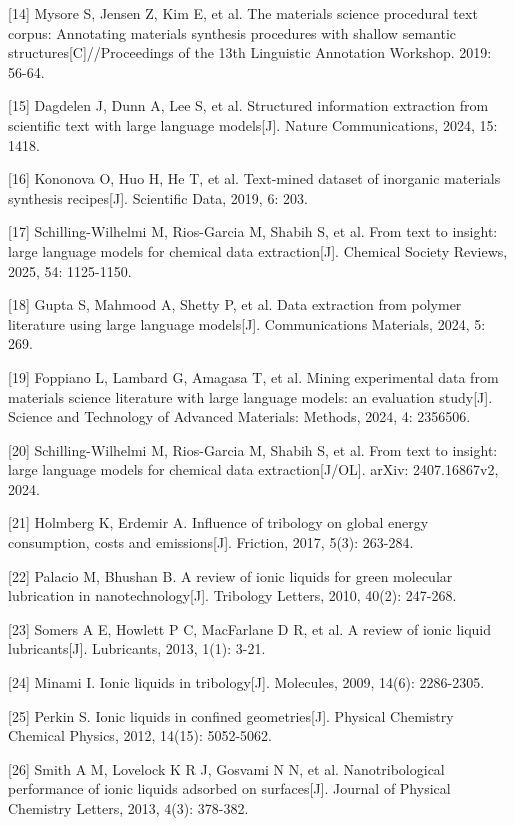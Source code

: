 {[}14{]} Mysore S, Jensen Z, Kim E, et al. The materials science procedural text corpus: Annotating materials synthesis procedures with shallow semantic structures{[}C{]}//Proceedings of the 13th Linguistic Annotation Workshop. 2019: 56-64.

{[}15{]} Dagdelen J, Dunn A, Lee S, et al. Structured information extraction from scientific text with large language models{[}J{]}. Nature Communications, 2024, 15: 1418.

{[}16{]} Kononova O, Huo H, He T, et al. Text-mined dataset of inorganic materials synthesis recipes{[}J{]}. Scientific Data, 2019, 6: 203.

{[}17{]} Schilling-Wilhelmi M, Rios-Garcia M, Shabih S, et al. From text to insight: large language models for chemical data extraction{[}J{]}. Chemical Society Reviews, 2025, 54: 1125-1150.

{[}18{]} Gupta S, Mahmood A, Shetty P, et al. Data extraction from polymer literature using large language models{[}J{]}. Communications Materials, 2024, 5: 269.

{[}19{]} Foppiano L, Lambard G, Amagasa T, et al. Mining experimental data from materials science literature with large language models: an evaluation study{[}J{]}. Science and Technology of Advanced Materials: Methods, 2024, 4: 2356506.

{[}20{]} Schilling-Wilhelmi M, Rios-Garcia M, Shabih S, et al. From text to insight: large language models for chemical data extraction{[}J/OL{]}. arXiv: 2407.16867v2, 2024.

{[}21{]} Holmberg K, Erdemir A. Influence of tribology on global energy consumption, costs and emissions{[}J{]}. Friction, 2017, 5(3): 263-284.

{[}22{]} Palacio M, Bhushan B. A review of ionic liquids for green molecular lubrication in nanotechnology{[}J{]}. Tribology Letters, 2010, 40(2): 247-268.

{[}23{]} Somers A E, Howlett P C, MacFarlane D R, et al. A review of ionic liquid lubricants{[}J{]}. Lubricants, 2013, 1(1): 3-21.

{[}24{]} Minami I. Ionic liquids in tribology{[}J{]}. Molecules, 2009, 14(6): 2286-2305.

{[}25{]} Perkin S. Ionic liquids in confined geometries{[}J{]}. Physical Chemistry Chemical Physics, 2012, 14(15): 5052-5062.

{[}26{]} Smith A M, Lovelock K R J, Gosvami N N, et al. Nanotribological performance of ionic liquids adsorbed on surfaces{[}J{]}. Journal of Physical Chemistry Letters, 2013, 4(3): 378-382.


